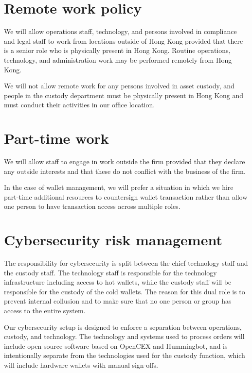 \section{Remote work policy}
We will allow operations staff, technology, and persons involved in
compliance and legal staff to work from locations outside of Hong Kong
provided that there is a senior role who is physically present in Hong
Kong.  Routine operations, technology, and administration work may be
performed remotely from Hong Kong.

We will not allow remote work for any persons involved in asset
custody, and people in the custody department must be physically
present in Hong Kong and must conduct their activities in our office
location.

\section{Part-time work}
We will allow staff to engage in work outside the firm provided
that they declare any outside interests and that these do not conflict
with the business of the firm.

In the case of wallet management, we will prefer a situation in which we
hire part-time additional resources to countersign wallet transaction
rather than allow one person to have transaction access across
multiple roles.

\section{Cybersecurity risk management}

The responsibility for cybersecurity is split between the chief
technology staff and the custody staff.  The technology staff is
responsible for the technology infrastructure including access to hot
wallets, while the custody staff will be responsible for the custody
of the cold wallets.  The reason for this dual role is to prevent
internal collusion and to make sure that no one person or group has
access to the entire system.

Our cybersecurity setup is designed to enforce a separation between
operations, custody, and technology.  The technology and systems used
to process orders will include open-source software based on OpenCEX
and Hummingbot, and is intentionally separate from the technologies
used for the custody function, which will include hardware wallets with
manual sign-offs.


